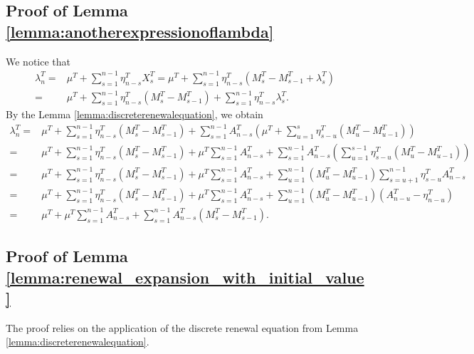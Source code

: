 \documentclass[letterpaper]{article}
\numberwithin{equation}{section}
\theoremstyle{definition}
\theoremstyle{remark}
\begin{document}
\subsection{Proof of Lemma \ref{lemma:anotherexpressionoflambda}}
\label{subsec:proofofanotherexpressionoflambda}
  We notice that
  \begin{align*}
    \lambda_n^T
    =&\mu^T+\sum_{s=1}^{n-1}\eta_{n-s}^TX_s^T
    =\mu^T+\sum_{s=1}^{n-1}\eta_{n-s}^T\left( M_s^T-M_{s-1}^T+\lambda_s^T \right)\\
    =&\mu^T+\sum_{s=1}^{n-1}\eta_{n-s}^T\left( M_s^T-M_{s-1}^T \right)+\sum_{s=1}^{n-1}\eta_{n-s}^T\lambda_s^T.
  \end{align*}
  By the Lemma \ref{lemma:discreterenewalequation}, we obtain
  \begin{align*}
    \lambda_n^T
    =&\mu^T+\sum_{s=1}^{n-1}\eta_{n-s}^T\left( M_s^T-M_{s-1}^T \right)+\sum_{s=1}^{n-1}A_{n-s}^T\left( \mu^T+\sum_{u=1}^s\eta_{s-u}^T\left( M_u^T-M_{u-1}^T \right)\right)\\
    =&\mu^T+\sum_{s=1}^{n-1}\eta_{n-s}^T\left( M_s^T-M_{s-1}^T \right)+\mu^T\sum_{s=1}^{n-1}A_{n-s}^T+\sum_{s=1}^{n-1}A_{n-s}^T\left( \sum_{u=1}^{s-1}\eta_{s-u}^T\left( M_u^T-M_{u-1}^T \right) \right)\\
    =&\mu^T+\sum_{s=1}^{n-1}\eta_{n-s}^T\left( M_s^T-M_{s-1}^T \right)+\mu^T\sum_{s=1}^{n-1}A_{n-s}^T+\sum_{u=1}^{n-1}(M_u^T-M_{u-1}^T)\sum_{s=u+1}^{n-1}\eta_{s-u}^TA_{n-s}^T\\
    =&\mu^T+\sum_{s=1}^{n-1}\eta_{n-s}^T\left( M_s^T-M_{s-1}^T \right)+\mu^T\sum_{s=1}^{n-1}A_{n-s}^T+\sum_{u=1}^{n-1}(M_u^T-M_{u-1}^T)\left( A_{n-u}^T-\eta_{n-u}^T \right)\\
    =&\mu^T+\mu^T\sum_{s=1}^{n-1}A_{n-s}^T+\sum_{s=1}^{n-1}A_{n-s}^T\left( M_{s}^T-M_{s-1}^T \right).
  \end{align*}

\subsection{Proof of Lemma \ref{lemma:renewal_expansion_with_initial_value}}
\label{subsection:proof_renewal_expansion_with_initial_value}

The proof relies on the application of the discrete renewal equation from Lemma \ref{lemma:discreterenewalequation}.
\end{document}
